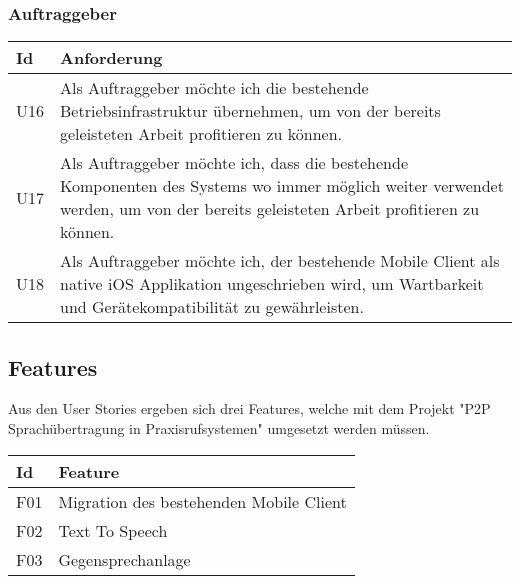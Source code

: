 \subsubsection*{Auftraggeber}

\begin{table}[h]
    \centering
    \begin{tabular}{|l|p{15cm}|}
        \hline
        \textbf{Id} & \textbf{Anforderung}                                                                                                                                                             \\
        \hline
        U16           & Als Auftraggeber möchte ich die bestehende Betriebsinfrastruktur übernehmen, um von der bereits geleisteten Arbeit profitieren zu können.                                        \\
        \hline
        U17           & Als Auftraggeber möchte ich, dass die bestehende Komponenten des Systems wo immer möglich weiter verwendet werden, um von der bereits geleisteten Arbeit profitieren zu können. \\
        \hline
        U18           & Als Auftraggeber möchte ich, der bestehende Mobile Client als native iOS Applikation ungeschrieben wird, um Wartbarkeit und Gerätekompatibilität zu gewährleisten. \\
        \hline
    \end{tabular}\label{tab:userstories3}
\end{table}

\subsection*{Features}

Aus den User Stories ergeben sich drei Features, welche mit dem Projekt "P2P Sprachübertragung in Praxisrufsystemen" umgesetzt werden müssen.

\begin{table}[h]
    \centering
    \begin{tabular}{|l|p{15cm}|}
        \hline
        \textbf{Id} & \textbf{Feature}                                                                                                                                                             \\
        \hline
        F01           & Migration des bestehenden Mobile Client                                        \\
        \hline
        F02           & Text To Speech \\
        \hline
        F03           & Gegensprechanlage \\
        \hline
    \end{tabular}\label{tab:features}
\end{table}


